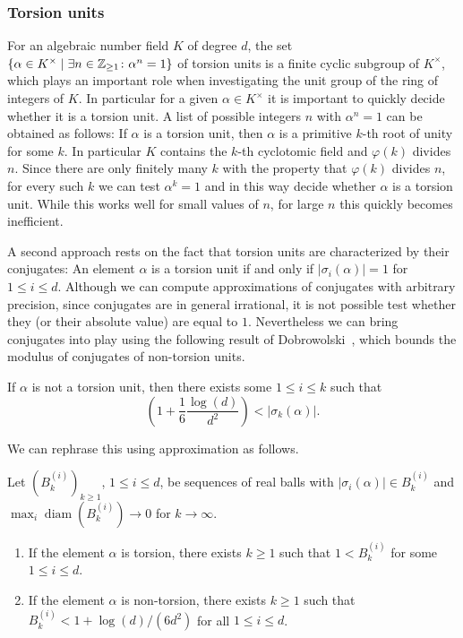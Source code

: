 \documentclass{sig-alternate-05-2015}
\begin{document}
\subsubsection{Torsion units}

For an algebraic number field $K$ of degree $d$, the set $\{ \alpha \in K^\times \mid \exists n \in \mathbb{Z}_{\geq 1} \colon \alpha^n = 1 \}$ of torsion units is a finite cyclic subgroup of $K^\times$, which plays an important role
when investigating the unit group of the ring of integers of $K$.
In particular for a given $\alpha \in K^\times$ it is important to quickly decide whether it is a torsion unit.
A list of possible integers $n$ with $\alpha^n = 1$ can be obtained as follows:
If $\alpha$ is a torsion unit, then $\alpha$ is a primitive $k$-th root of unity for some $k$.
In particular $K$ contains the $k$-th cyclotomic field and $\varphi(k)$ divides $n$.
Since there are only finitely many $k$ with the property that $\varphi(k)$ divides $n$, for every such $k$ we can test $\alpha^k = 1$ and in this way decide whether $\alpha$ is a torsion unit.
While this works well for small values of $n$, for large $n$ this quickly becomes inefficient.

A second approach rests on the fact that torsion units are characterized by their conjugates: An element $\alpha$ is a torsion unit if and only if $\lvert \sigma_i(\alpha) \rvert = 1$ for $1 \leq i \leq d$.
Although we can compute approximations of conjugates with arbitrary precision, since conjugates are in general irrational, it is not possible test whether they (or their absolute value) are equal to $1$.
Nevertheless we can bring conjugates into play using the following result of Dobrowolski~\cite{Dobrowolski1978}, which bounds the modulus of conjugates of non-torsion units.

\begin{lemma}
If $\alpha$ is not a torsion unit, then there exists some $1 \leq i \leq k$ such that
\[ \left(1 + \frac 1 6 \frac{\log(d)}{d^2} \right) < \lvert \sigma_k(\alpha) \rvert. \]
\end{lemma}

We can rephrase this using approximation as follows.

\begin{lemma}\label{lem:tor}
  Let $(B^{(i)}_k)_{k \geq 1}$, $1 \leq i \leq d$, be sequences of real balls with $\lvert \sigma_i(\alpha) \rvert \in B^{(i)}_k$ and $\max_i\operatorname{diam}(B_k^{(i)}) \to 0$ for $k \to \infty$.
  \begin{enumerate}
  \item
    If the element $\alpha$ is torsion, there exists $k \geq 1$ such that $1 < B_k^{(i)}$ for some $1 \leq i \leq d$.
  \item
    If the element $\alpha$ is non-torsion, there exists $k \geq 1$ such that $B_k^{(i)} < 1 + \log(d)/(6d^2)$ for all $1 \leq i \leq d$.
  \end{enumerate}
\end{lemma}
\end{document}
